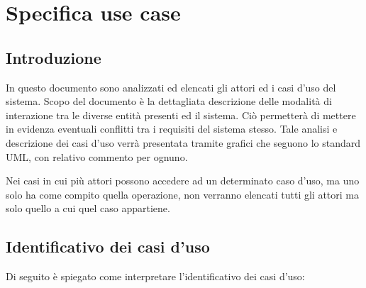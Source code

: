 \chapter{Specifica use case}

\section{Introduzione}
In questo documento sono analizzati ed elencati gli attori ed i casi d'uso del sistema.
Scopo del documento è la dettagliata descrizione delle modalità di interazione tra le diverse entità presenti ed il sistema.
Ciò permetterà di mettere in evidenza eventuali conflitti tra i requisiti del sistema stesso.
Tale analisi e descrizione dei casi d'uso verrà presentata tramite grafici che seguono lo standard UML, con relativo commento per ognuno.

Nei casi in cui più attori possono accedere ad un determinato caso d’uso, ma uno
solo ha come compito quella operazione, non verranno elencati tutti gli attori
ma solo quello a cui quel caso appartiene.

\section{Identificativo dei casi d'uso} %
Di seguito è spiegato come interpretare l'identificativo dei casi d'uso:
\begin{center}
\end{center}

